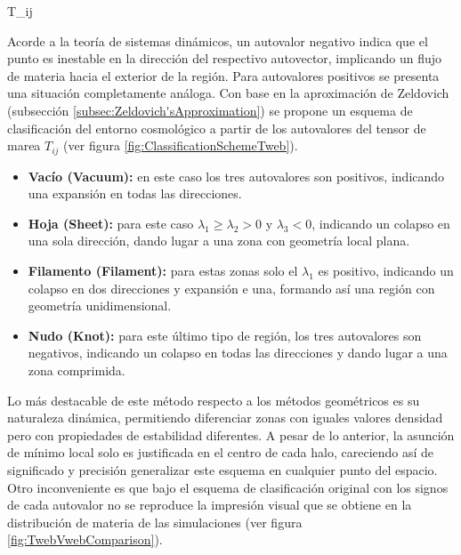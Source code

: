 { T_{ij} \equiv {}}


Acorde a la teoría de sistemas dinámicos, un autovalor negativo indica que
el punto es inestable en la dirección del respectivo autovector, implicando 
un flujo de materia hacia el exterior de la región. Para autovalores 
positivos se presenta una situación completamente análoga. Con base en la 
aproximación de Zeldovich (subsección \ref{subsec:Zeldovich'sApproximation})
se propone un esquema de clasificación del entorno cosmológico a partir de 
los autovalores del tensor de marea $T_{ij}$ 
(ver figura \ref{fig:ClassificationSchemeTweb}).


\begin{itemize}
\item \textbf{Vacío (Vacuum):} en este caso los tres autovalores son positivos, 
indicando una expansión en todas las direcciones.
\item \textbf{Hoja (Sheet):} para este caso $\lambda_1\geq\lambda_2>0$ y 
$\lambda_3<0$, indicando un colapso en una sola dirección, dando lugar a una 
zona con geometría local plana.
\item \textbf{Filamento (Filament):} para estas zonas solo el $\lambda_1$ es
positivo, indicando un colapso en dos direcciones y expansión e una, formando
así una región con geometría unidimensional.
\item \textbf{Nudo (Knot):} para este último tipo de región, los tres 
autovalores son negativos, indicando un colapso en todas las direcciones y 
dando lugar a una zona comprimida.
\end{itemize}


Lo más destacable de este método respecto a los métodos geométricos es su 
naturaleza dinámica, permitiendo diferenciar zonas con iguales valores 
densidad pero con propiedades de estabilidad diferentes. A pesar de lo 
anterior, la asunción de mínimo local solo es justificada en el centro de 
cada halo, careciendo así de significado y precisión generalizar este 
esquema en cualquier punto del espacio. Otro inconveniente es que bajo el 
esquema de clasificación original con los signos de cada autovalor no se 
reproduce la impresión visual que se obtiene en la distribución de materia
de las simulaciones (ver figura \ref{fig:TwebVwebComparison}).


